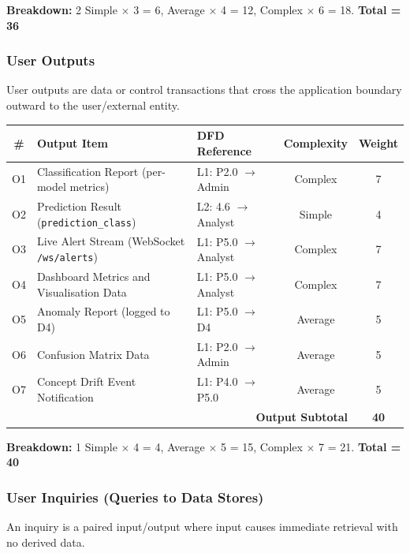 \documentclass[11pt, a4paper]{article}
\begin{document}
\textbf{Breakdown:} 2 Simple $\times$ 3 = 6,  Average $\times$ 4 = 12,  Complex $\times$ 6 = 18. \quad \textbf{Total = 36}

\subsubsection{User Outputs}
User outputs are data or control transactions that cross the application boundary outward to the user/external entity.

\begin{center}
\begin{tabular}{|c|l|l|c|c|}
\hline
\textbf{\#} & \textbf{Output Item} & \textbf{DFD Reference} & \textbf{Complexity} & \textbf{Weight} \\ \hline
O1 & Classification Report (per-model metrics)          & L1: P2.0 $\to$ Admin           & Complex  & 7 \\ \hline
O2 & Prediction Result (\texttt{prediction\_class})      & L2: 4.6 $\to$ Analyst          & Simple   & 4 \\ \hline
O3 & Live Alert Stream (WebSocket \texttt{/ws/alerts})   & L1: P5.0 $\to$ Analyst         & Complex  & 7 \\ \hline
O4 & Dashboard Metrics and Visualisation Data            & L1: P5.0 $\to$ Analyst         & Complex  & 7 \\ \hline
O5 & Anomaly Report (logged to D4)                       & L1: P5.0 $\to$ D4             & Average  & 5 \\ \hline
O6 & Confusion Matrix Data                               & L1: P2.0 $\to$ Admin           & Average  & 5 \\ \hline
O7 & Concept Drift Event Notification                    & L1: P4.0 $\to$ P5.0           & Average  & 5 \\ \hline
\multicolumn{4}{|r|}{\textbf{Output Subtotal}} & \textbf{40} \\ \hline
\end{tabular}
\end{center}

\textbf{Breakdown:} 1 Simple $\times$ 4 = 4,  Average $\times$ 5 = 15,  Complex $\times$ 7 = 21. \quad \textbf{Total = 40}

\subsubsection{User Inquiries (Queries to Data Stores)}
An inquiry is a paired input/output where input causes immediate retrieval with no derived data.
\end{document}
